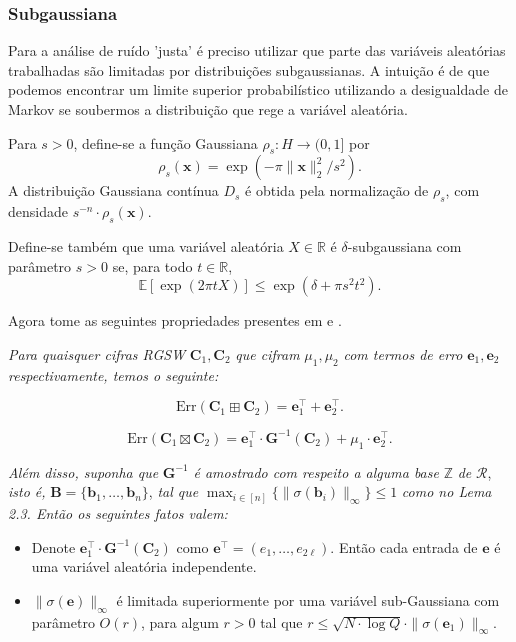 \subsubsection{Subgaussiana}
Para a análise de ruído 'justa' é preciso utilizar que parte das variáveis aleatórias trabalhadas são limitadas por distribuições 
subgaussianas. A intuição é de que podemos encontrar um limite superior probabilístico utilizando a desigualdade de Markov se soubermos
a distribuição que rege a variável aleatória. 

\begin{definition}
    Para \( s > 0 \), define-se a função Gaussiana \( \rho_s : H \to (0,1] \) por
\[
\rho_s(\mathbf{x}) = \exp\left(-\pi \|\mathbf{x}\|_2^2 / s^2\right).
\]
A distribuição Gaussiana contínua \( D_s \) é obtida pela normalização de \( \rho_s \), com densidade \( s^{-n} \cdot \rho_s(\mathbf{x}) \).

Define-se também que uma variável aleatória \( X \in \mathbb{R} \) é \( \delta \)-subgaussiana com parâmetro \( s > 0 \) se, para todo \( t \in \mathbb{R} \),
\[
\mathbb{E}[\exp(2\pi t X)] \leq \exp(\delta + \pi s^2 t^2).
\]

\end{definition}

Agora tome as seguintes propriedades presentes em \cite{lyubashevsky2013} e \cite{lw23I}.

\begin{lemma}
    \textit{Para quaisquer cifras RGSW} $\mathbf{C}_1, \mathbf{C}_2$ \textit{que cifram} $\mu_1, \mu_2$ \textit{com termos de erro} $\mathbf{e}_1, \mathbf{e}_2$ \textit{respectivamente, temos o seguinte:}

    \[
    \text{Err}(\mathbf{C}_1 \boxplus \mathbf{C}_2) = \mathbf{e}_1^\top + \mathbf{e}_2^\top.
    \]

    \[
    \text{Err}(\mathbf{C}_1 \boxtimes \mathbf{C}_2) = \mathbf{e}_1^\top \cdot \mathbf{G}^{-1}(\mathbf{C}_2) + \mu_1 \cdot \mathbf{e}_2^\top.
    \]

    \textit{Além disso, suponha que} $\mathbf{G}^{-1}$ \textit{é amostrado com respeito a alguma base} $\mathbb{Z}$ \textit{de} $\mathcal{R}$, \textit{isto é,} $\mathbf{B} = \{ \mathbf{b}_1, \dots, \mathbf{b}_n \}$, \textit{tal que} $\max_{i \in [n]} \{ \| \sigma(\mathbf{b}_i) \|_\infty \} \leq 1$ \textit{como no Lema 2.3. Então os seguintes fatos valem:}

    \begin{itemize}
    \item Denote $\mathbf{e}_1^\top \cdot \mathbf{G}^{-1}(\mathbf{C}_2)$ como $\mathbf{e}^\top = (e_1, \dots, e_{2\ell})$. Então cada entrada de $\mathbf{e}$ é uma variável aleatória independente.

    \item $\|\sigma(\mathbf{e})\|_\infty$ é limitada superiormente por uma variável sub-Gaussiana com parâmetro $O(r)$, para algum $r > 0$ tal que $r \leq \sqrt{N \cdot \log Q} \cdot \|\sigma(\mathbf{e}_1)\|_\infty$.
    \end{itemize}
\end{lemma}

